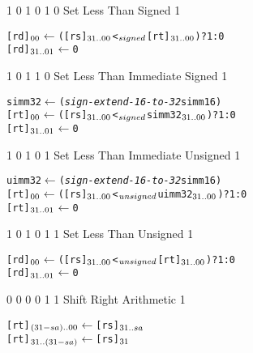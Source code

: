    {1 0 1 0 1 0}    {Set Less Than Signed}          {1}    {\MIPSTag}
\begin{alltt}
        [rd]\({\sb{00}}\) \hspace{.75mm}  \(\leftarrow\) ([rs]\({\sb{31..00}}\) <\(\sb{signed}\) [rt]\({\sb{31..00}}\)) ? 1 : 0
        [rd]\({\sb{31..01}}\) \(\leftarrow\) 0
\end{alltt}\rawInstrEnd

   {1 0 1 1 0}    {Set Less Than Immediate Signed}          {1}    {\MIPSTag}
\begin{alltt}
        simm32  \hspace{0mm} \(\leftarrow\) ({\em{sign-extend-16-to-32}} simm16)
        [rt]\({\sb{00}}\)  \hspace{.75mm} \(\leftarrow\) ([rs]\({\sb{31..00}}\) <\(\sb{signed}\) simm32\({\sb{31..00}}\)) ? 1 : 0
        [rt]\({\sb{31..01}}\) \(\leftarrow\) 0
\end{alltt}\rawInstrEnd

   {1 0 1 0 1}    {Set Less Than Immediate Unsigned}          {1}    {\MIPSTag}
\begin{alltt}
        uimm32  \hspace{0mm} \(\leftarrow\) ({\em{sign-extend-16-to-32}} simm16)
        [rt]\({\sb{00}}\)  \hspace{.75mm} \(\leftarrow\) ([rs]\({\sb{31..00}}\) <\(\sb{unsigned}\) uimm32\({\sb{31..00}}\)) ? 1 : 0
        [rt]\({\sb{31..01}}\) \(\leftarrow\) 0
\end{alltt}\rawInstrEnd

   {1 0 1 0 1 1}    {Set Less Than Unsigned}          {1}    {\MIPSTag}
\begin{alltt}
        [rd]\({\sb{00}}\)  \hspace{1mm} \(\leftarrow\) ([rs]\({\sb{31..00}}\) <\(\sb{unsigned}\) [rt]\({\sb{31..00}}\)) ? 1 : 0
        [rd]\({\sb{31..01}}\) \(\leftarrow\) 0
\end{alltt}\rawInstrEnd

    {0 0 0 0 1 1}    {Shift Right Arithmetic}          {1}    {\MIPSTag}
\begin{alltt}
        [rt]\({\sb{(31-sa)..00}}\) \(\leftarrow\) [rs]\({\sb{31..sa}}\)
        [rt]\({\sb{31..(31-sa)}}\) \(\leftarrow\) [rs]\({\sb{31}}\)
\end{alltt}\rawInstrEnd


